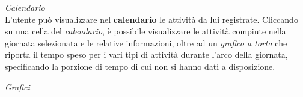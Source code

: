 \documentclass{article}
\begin{document}
\textit{Calendario} \vspace*{7pt}\\
L'utente può visualizzare nel \textbf{calendario} le attività da lui registrate. Cliccando su una cella del \textit{calendario}, è possibile visualizzare le attività compiute nella giornata selezionata e le relative informazioni, oltre ad un \textit{grafico a torta} che riporta il tempo speso per i vari tipi di attività durante l'arco della giornata, specificando la porzione di tempo di cui non si hanno dati a disposizione.
\begin{center}
    \begin{figure}[h]
        \centering
    \end{figure}
\end{center}
\textit{Grafici} \vspace*{7pt}\\
\end{document}
